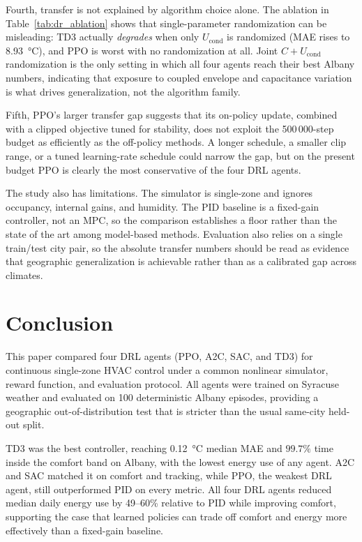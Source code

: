 \documentclass[conference]{IEEEtran}
\begin{document}
Fourth, transfer is not explained by algorithm choice alone. The
ablation in Table~\ref{tab:dr_ablation} shows that single-parameter
randomization can be misleading: TD3 actually \emph{degrades} when only
$U_{\text{cond}}$ is randomized (MAE rises to
\SI{8.93}{\degreeCelsius}), and PPO is worst with no randomization at
all. Joint $C{+}U_{\text{cond}}$ randomization is the only setting in
which all four agents reach their best Albany numbers, indicating that
exposure to coupled envelope and capacitance variation is what drives
generalization, not the algorithm family.

Fifth, PPO's larger transfer gap suggests that its on-policy update,
combined with a clipped objective tuned for stability, does not exploit
the 500\,000-step budget as efficiently as the off-policy methods. A
longer schedule, a smaller clip range, or a tuned learning-rate
schedule could narrow the gap, but on the present budget PPO is
clearly the most conservative of the four DRL agents.

The study also has limitations. The simulator is single-zone and
ignores occupancy, internal gains, and humidity. The PID baseline is a
fixed-gain controller, not an MPC, so the comparison establishes a
floor rather than the state of the art among model-based methods.
Evaluation also relies on a single train/test city pair, so the
absolute transfer numbers should be read as evidence that geographic
generalization is achievable rather than as a calibrated gap across
climates.

\section{Conclusion}
\label{sec:conclusion}

This paper compared four DRL agents (PPO, A2C, SAC, and TD3) for
continuous single-zone HVAC control under a common nonlinear simulator,
reward function, and evaluation protocol. All agents were trained on
Syracuse weather and evaluated on 100 deterministic Albany episodes,
providing a geographic out-of-distribution test that is stricter than
the usual same-city held-out split.

TD3 was the best controller, reaching \SI{0.12}{\degreeCelsius} median
MAE and $99.7\%$ time inside the comfort band on Albany, with the
lowest energy use of any agent. A2C and SAC matched it on comfort and
tracking, while PPO, the weakest DRL agent, still outperformed PID on
every metric. All four DRL agents reduced median daily energy use by
49--60\% relative to PID while improving comfort, supporting the case
that learned policies can trade off comfort and energy more effectively
than a fixed-gain baseline.
\end{document}
